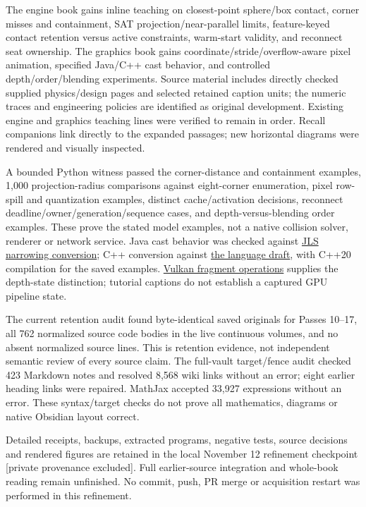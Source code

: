 The engine book gains inline teaching on closest-point sphere/box contact, corner misses and containment, SAT projection/near-parallel limits, feature-keyed contact retention versus active constraints, warm-start validity, and reconnect seat ownership. The graphics book gains coordinate/stride/overflow-aware pixel animation, specified Java/C++ cast behavior, and controlled depth/order/blending experiments. Source material includes directly checked supplied physics/design pages and selected retained caption units; the numeric traces and engineering policies are identified as original development. Existing engine and graphics teaching lines were verified to remain in order. Recall companions link directly to the expanded passages; new horizontal diagrams were rendered and visually inspected.

A bounded Python witness passed the corner-distance and containment examples, 1,000 projection-radius comparisons against eight-corner enumeration, pixel row-spill and quantization examples, distinct cache/activation decisions, reconnect deadline/owner/generation/sequence cases, and depth-versus-blending order examples. These prove the stated model examples, not a native collision solver, renderer or network service. Java cast behavior was checked against \href{https://docs.oracle.com/javase/specs/jls/se21/html/jls-5.html\#jls-5.1.3}{JLS narrowing conversion}; C++ conversion against \href{https://eel.is/c++draft/conv.fpint}{the language draft}, with C++20 compilation for the saved examples. \href{https://docs.vulkan.org/spec/latest/chapters/fragops.html}{Vulkan fragment operations} supplies the depth-state distinction; tutorial captions do not establish a captured GPU pipeline state.

The current retention audit found byte-identical saved originals for Passes 10--17, all 762 normalized source code bodies in the live continuous volumes, and no absent normalized source lines. This is retention evidence, not independent semantic review of every source claim. The full-vault target/fence audit checked 423 Markdown notes and resolved 8,568 wiki links without an error; eight earlier heading links were repaired. MathJax accepted 33,927 expressions without an error. These syntax/target checks do not prove all mathematics, diagrams or native Obsidian layout correct.

Detailed receipts, backups, extracted programs, negative tests, source decisions and rendered figures are retained in the local {November 12 refinement checkpoint {[}private provenance excluded{]}}. Full earlier-source integration and whole-book reading remain unfinished. No commit, push, PR merge or acquisition restart was performed in this refinement.


